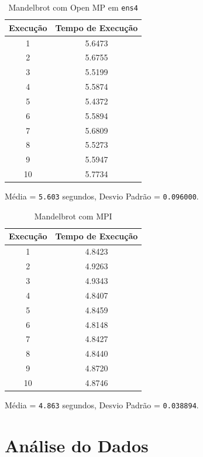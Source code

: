 \documentclass[10pt,a4paper]{article}
\begin{document}
		\begin{table}[htb]
			\centering
			\begin{tabular}{|c|c|}
				\hline
				Execução & Tempo de Execução\\ \hline
				1  & 5.6473 \\ \hline
				2  & 5.6755 \\ \hline
				3  & 5.5199 \\ \hline
				4  & 5.5874 \\ \hline
				5  & 5.4372 \\ \hline
				6  & 5.5894 \\ \hline
				7  & 5.6809 \\ \hline
				8  & 5.5273 \\ \hline
				9  & 5.5947 \\ \hline
				10 & 5.7734 \\ \hline
			\end{tabular}
			\caption{Mandelbrot com Open MP em \texttt{ens4}}
		\end{table}
		Média = \texttt{5.603} segundos, Desvio Padrão = \texttt{0.096000}.

		\clearpage

		\begin{table}[htb]
			\centering
			\begin{tabular}{|c|c|}
				\hline
				Execução & Tempo de Execução\\ \hline
				1  & 4.8423 \\ \hline
				2  & 4.9263 \\ \hline
				3  & 4.9343 \\ \hline
				4  & 4.8407 \\ \hline
				5  & 4.8459 \\ \hline
				6  & 4.8148 \\ \hline
				7  & 4.8427 \\ \hline
				8  & 4.8440 \\ \hline
				9  & 4.8720 \\ \hline
				10 & 4.8746 \\ \hline
			\end{tabular}
			\caption{Mandelbrot com MPI}
		\end{table}
		Média = \texttt{4.863} segundos, Desvio Padrão = \texttt{0.038894}.

	\section{Análise do Dados}
\end{document}
